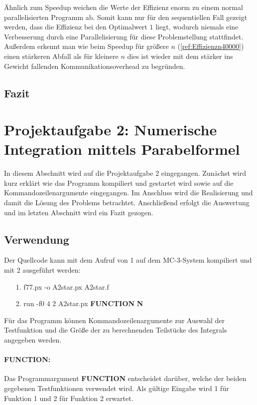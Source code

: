 Ähnlich zum Speedup weichen die Werte der Effizienz enorm zu einem normal parallelisierten Programm ab. 
Somit kann nur für den sequentiellen Fall gezeigt werden, dass die Effizienz bei den Optimalwert $1$ liegt, wodurch niemals eine Verbesserung durch eine Parallelisierung für diese Problemstellung stattfindet. Außerdem erkennt man wie beim Speedup für größere $n$ (\autoref{ref:Effizienzn40000}) einen stärkeren Abfall als für kleinere $n$ dies ist wieder mit dem stärker ins Gewicht fallenden Kommunikationsoverhead zu begründen.

\subsection{Fazit}

\pagebreak

\section{Projektaufgabe 2: Numerische Integration mittels Parabelformel}
\lstset{language=Fortran,frame=none, keepspaces=false,tabsize=1,captionpos=b, basicstyle=\scriptsize,showstringspaces=false,breaklines=true}  
In diesem Abschnitt wird auf die Projektaufgabe 2 eingegangen.
Zunächst wird kurz erklärt wie das Programm kompiliert und gestartet wird sowie auf die Kommandozeilenargumente eingegangen.
Im Anschluss wird die Realisierung und damit die Lösung des Problems betrachtet.
Anschließend erfolgt die Auswertung und im letzten Abschnitt wird ein Fazit gezogen.

\subsection{Verwendung}
\label{ref:verwendung}
Der Quellcode kann mit dem Aufruf von 1 auf dem MC-3-System kompiliert und mit 2 ausgeführt werden:
\begin{itemize}
	\item[1.] f77.px -o A2star.px A2star.f
	\item[2.] run -f0 4 2 A2star.px \textbf{FUNCTION} \textbf{N}
\end{itemize}
Für das Programm können Kommandozeilenargumente zur Auswahl der Testfunktion und die Größe der zu berechnenden Teilstücke des Integrals angegeben werden.
\paragraph{FUNCTION:}
Das Programmargument \textbf{FUNCTION} entscheidet darüber, welche der beiden gegebenen Testfunktionen verwendet wird.
Als gültige Eingabe wird 1 für Funktion 1 und 2 für Funktion 2 erwartet.
